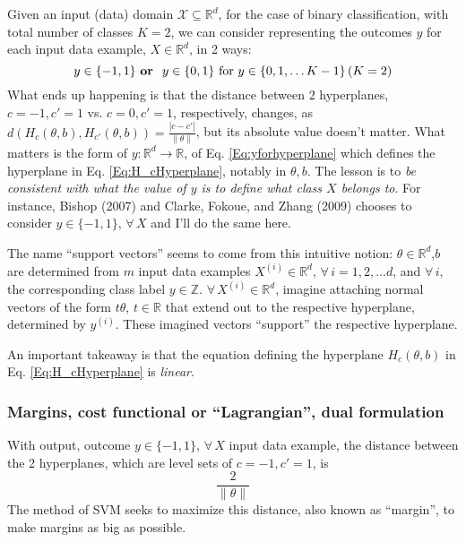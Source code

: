 \documentclass[10pt]{amsart}
\begin{document}
\begin{multicols*}{2}
Given an input (data) domain $\mathcal{X}\subseteq \mathbb{R}^d$, for the case of binary classification, with total number of classes $K=2$, we can consider representing the outcomes $y$ for each input data example, $X \in \mathbb{R}^d$, in 2 ways:
\begin{equation}
  y\in \lbrace -1 , 1 \rbrace \text{ \textbf{or } } y\in \lbrace 0,1 \rbrace \text{ for } y \in \lbrace 0 , 1, \dots K-1\rbrace \, (K=2)
  \end{equation}
What ends up happening is that the distance between 2 hyperplanes, $c=-1,c'=1$ vs. $c=0,c'=1$, respectively, changes, as $d(H_c(\theta,b),H_{c'}(\theta,b)) = \frac{ |c-c' | }{ \| \theta \| }$, but its absolute value doesn't matter.  What matters is the form of $y:\mathbb{R}^d \to \mathbb{R}$, of Eq. \ref{Eq:yforhyperplane} which defines the hyperplane in Eq. \ref{Eq:H_cHyperplane}, notably in $\theta,b$.  The lesson is to \emph{be consistent with what the value of $y$ is to define what class $X$ belongs to}.  For instance, Bishop (2007) \cite{Bish2007} and Clarke, Fokoue, and Zhang (2009) \cite{CFZ2009} chooses to consider $y\in \lbrace - 1, 1 \rbrace, \, \forall \, X$ and I'll do the same here.

The name ``support vectors'' seems to come from this intuitive notion: $\theta \in \mathbb{R}^d$,$b$ are determined from $m$ input data examples $X^{(i)} \in \mathbb{R}^d$, $\forall \, i = 1, 2, \dots d$, and $\forall \, i$, the corresponding class label $y\in \mathbb{Z}$.  $\forall \, X^{(i)} \in \mathbb{R}^d$, imagine attaching normal vectors of the form $t\theta$, $t\in\mathbb{R}$ that extend out to the respective hyperplane, determined by $y^{(i)}$.  These imagined vectors ``support'' the respective hyperplane.  

An important takeaway is that the equation defining the hyperplane $H_c{(\theta,b)}$ in Eq. \ref{Eq:H_cHyperplane} is \emph{linear}.  

\subsubsection{Margins, cost functional or ``Lagrangian'', dual formulation}\label{SubSec:MarginsLagrangian}

With output, outcome $y\in \lbrace - 1, 1 \rbrace, \, \forall \, X$ input data example, the distance between the 2 hyperplanes, which are level sets of $c=-1,c'=1$, is
\[
\frac{2}{\| \theta \| }
\]
The method of SVM seeks to maximize this distance, also known as ``margin'', to make margins as big as possible.  


\end{multicols*}
\end{document}
